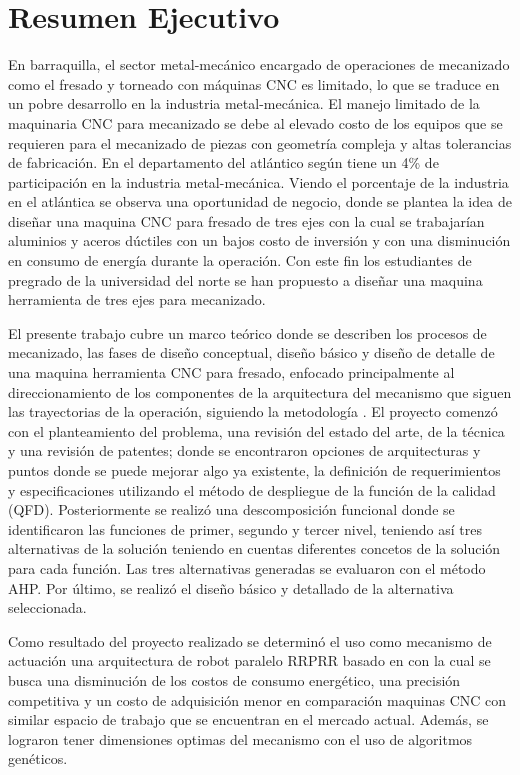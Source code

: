 \chapter*{Resumen Ejecutivo}
En barraquilla, el sector metal-mecánico encargado de operaciones de mecanizado como el fresado y torneado con máquinas CNC es limitado, lo que se traduce en un pobre desarrollo en la industria metal-mecánica. El manejo limitado de la maquinaria CNC para mecanizado se debe al elevado costo de los equipos que se requieren para el mecanizado de piezas con geometría compleja y altas tolerancias de fabricación. En el departamento del atlántico según \cite{lora2012determinantes} tiene un 4\% de participación en la industria metal-mecánica. Viendo el porcentaje de la industria en el atlántica se observa una oportunidad de negocio, donde se plantea la idea de diseñar una maquina CNC para fresado de tres ejes con la cual se trabajarían aluminios y aceros dúctiles con un bajos costo de inversión y con una disminución en consumo de energía durante la operación. Con este fin los estudiantes de pregrado de la universidad del norte se han propuesto a diseñar una maquina herramienta de tres ejes para mecanizado.

El presente trabajo cubre un marco teórico donde se describen los procesos de mecanizado, las fases de diseño conceptual, diseño básico y diseño de detalle de una maquina herramienta CNC para fresado, enfocado principalmente al direccionamiento de los componentes de la arquitectura del mecanismo que siguen las trayectorias de la operación, siguiendo la metodología \cite{dieter2012engineering}. El proyecto comenzó con el planteamiento del problema, una revisión del estado del arte, de la técnica y una revisión de patentes; donde se encontraron opciones de arquitecturas y puntos donde se puede mejorar algo ya existente, la definición de requerimientos y especificaciones utilizando el método de despliegue de la función de la calidad (QFD). Posteriormente se realizó una descomposición funcional donde se identificaron las funciones de primer, segundo y tercer nivel, teniendo así tres alternativas de la solución teniendo en cuentas diferentes concetos de la solución para cada función. Las tres alternativas generadas se evaluaron con el método AHP. Por último, se realizó el diseño básico y detallado de la alternativa seleccionada.

Como resultado del proyecto realizado se determinó el uso como mecanismo de actuación una arquitectura de robot paralelo RRPRR basado en \cite{petko2005mechatronic} con la cual se busca una disminución de los costos de consumo energético, una precisión competitiva y un costo de adquisición menor en comparación maquinas CNC con similar espacio de trabajo que se encuentran en el mercado actual. Además, se lograron tener dimensiones optimas del mecanismo con el uso de algoritmos genéticos.
